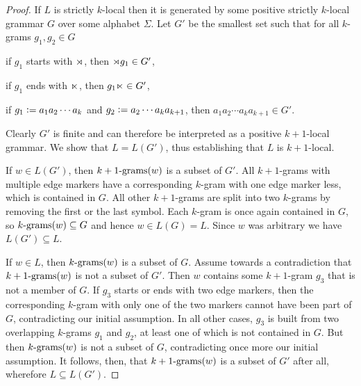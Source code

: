 \begin{proof}
    If $L$ is strictly $k$-local then it is generated by some positive strictly $k$-local grammar $G$ over some alphabet $\Sigma$.
    Let $G'$ be the smallest set such that for all $k$-grams $g_1, g_2 \in G$
    \begin{itemize*}
        \item if $g_1$ starts with $\LeftEdge$, then $\LeftEdge g_1 \in G'$,
        \item if $g_1$ ends with $\RightEdge$, then $g_1 \RightEdge \in G'$,
        \item if $g_1 \is a_1 a_2 \cdots a_{k}$ and $g_2 \is a_2 \cdots a_k a_{k+1}$, then $a_1 a_2 \cdots a_k a_{k+1} \in G'$.
    \end{itemize*}
    Clearly $G'$ is finite and can therefore be interpreted as a positive $k+1$-local grammar.
    We show that $L = L(G')$, thus establishing that $L$ is $k+1$-local.
    
    If $w \in L(G')$, then $\Bigrams[k+1](w)$ is a subset of $G'$.
    All $k+1$-grams with multiple edge markers have a corresponding $k$-gram with one edge marker less, which is contained in $G$.
    All other $k+1$-grams are split into two $k$-grams by removing the first or the last symbol.
    Each $k$-gram is once again contained in $G$, so $\Bigrams[k](w) \subseteq G$ and hence $w \in L(G) = L$.
    Since $w$ was arbitrary we have $L(G') \subseteq L$.

    If $w \in L$, then $\Bigrams[k](w)$ is a subset of $G$.
    Assume towards a contradiction that $\Bigrams[k+1](w)$ is not a subset of $G'$.
    Then $w$ contains some $k+1$-gram $g_3$ that is not a member of $G$.
    If $g_3$ starts or ends with two edge markers, then the corresponding $k$-gram with only one of the two markers cannot have been part of $G$, contradicting our initial assumption.
    In all other cases, $g_3$ is built from two overlapping $k$-grams $g_1$ and $g_2$, at least one of which is not contained in $G$.
    But then $\Bigrams[k](w)$ is not a subset of $G$, contradicting once more our initial assumption.
    It follows, then, that $\Bigrams[k+1](w)$ is a subset of $G'$ after all, wherefore $L \subseteq L(G')$.
\end{proof}

